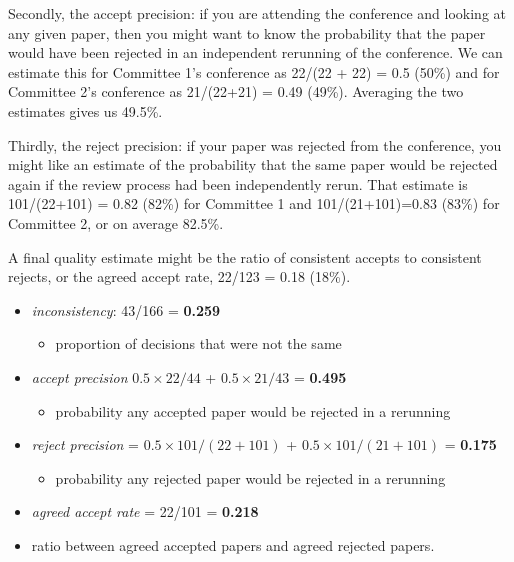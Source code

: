 Secondly, the accept precision: if you are
attending the conference and looking at any given paper, then you might
want to know the probability that the paper would have been rejected in
an independent rerunning of the conference. We can estimate this for
Committee 1's conference as 22/(22 + 22) = 0.5 (50\%) and for Committee
2's conference as 21/(22+21) = 0.49 (49\%). Averaging the two estimates
gives us 49.5\%. 

Thirdly, the reject precision: if your paper was
rejected from the conference, you might like an estimate of the
probability that the same paper would be rejected again if the review
process had been independently rerun. That estimate is 101/(22+101) =
0.82 (82\%) for Committee 1 and 101/(21+101)=0.83 (83\%) for Committee
2, or on average 82.5\%. 

A final quality estimate might be the ratio of
consistent accepts to consistent rejects, or the agreed accept rate,
22/123 = 0.18 (18\%).

\begin{itemize}
\tightlist
\item
  \emph{inconsistency}: 43/166 = \textbf{0.259}

  \begin{itemize}
  \tightlist
  \item
    proportion of decisions that were not the same
  \end{itemize}
\item
  \emph{accept precision} \(0.5 \times 22/44\) + \(0.5 \times 21/43\) =
  \textbf{0.495}

  \begin{itemize}
  \tightlist
  \item
    probability any accepted paper would be rejected in a rerunning
  \end{itemize}
\item
  \emph{reject precision} = \(0.5\times 101/(22+101)\) +
  \(0.5\times 101/(21 + 101)\) = \textbf{0.175}

  \begin{itemize}
  \tightlist
  \item
    probability any rejected paper would be rejected in a rerunning
  \end{itemize}
\item
  \emph{agreed accept rate} = 22/101 = \textbf{0.218}
\item
  ratio between agreed accepted papers and agreed rejected papers.
\end{itemize}

